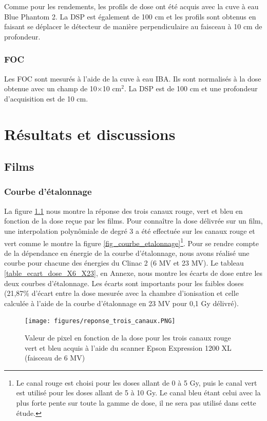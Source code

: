 \documentclass{book}
\begin{document}
Comme pour les rendements, les profils de dose ont été acquis avec la cuve à eau Blue Phantom 2. La DSP est également de 100 cm et les profils sont obtenus en faisant se déplacer le détecteur de manière perpendiculaire au faisceau à 10 cm de profondeur.

\subsection{FOC}

Les FOC sont mesurés à l'aide de la cuve à eau IBA. Ils sont normalisés à la dose obtenue avec un champ de 10$\times$10 cm$^2$. La DSP est de 100 cm et une profondeur d'acquisition est de 10 cm.


\chapter{Résultats et discussions}
\section{Films}
\subsection{Courbe d'étalonnage}

La figure \ref*{fig_reponse_canaux} nous montre la réponse des trois canaux rouge, vert et bleu en fonction de la dose reçue par les films. Pour connaître la dose délivrée sur un film, une interpolation polynômiale de degré 3 a été effectuée sur les canaux rouge et vert comme le montre la figure \ref*{fig_courbe_etalonnage}\footnote{Le canal rouge est choisi pour les doses allant de 0 à 5 Gy, puis le canal vert est utilisé pour les doses allant de 5 à 10 Gy. Le canal bleu étant celui avec la plus forte pente sur toute la gamme de dose, il ne sera pas utilisé dans cette étude.}. Pour se rendre compte de la dépendance en énergie de la courbe d'étalonnage, nous avons réalisé une courbe pour chacune des énergies du Clinac 2 (6 MV et 23 MV). Le tableau \ref*{table_ecart_dose_X6_X23}, en Annexe, nous montre les écarts de dose entre les deux courbes d'étalonnage. Les écarts sont importants pour les faibles doses (21,87\% d'écart entre la dose mesurée avec la chambre d'ionisation et celle calculée à l'aide de la courbe d'étalonnage en 23 MV pour 0,1 Gy délivré).


\begin{figure}[h]
  \centering
  \texttt{[image: figures/reponse\_trois\_canaux.PNG]}
  \caption{Valeur de pixel en fonction de la dose pour les trois canaux rouge vert et bleu acquis à l'aide du scanner Epson Expression 1200 XL (faisceau de 6 MV)}
  \label{fig_reponse_canaux}
\end{figure}
\end{document}
